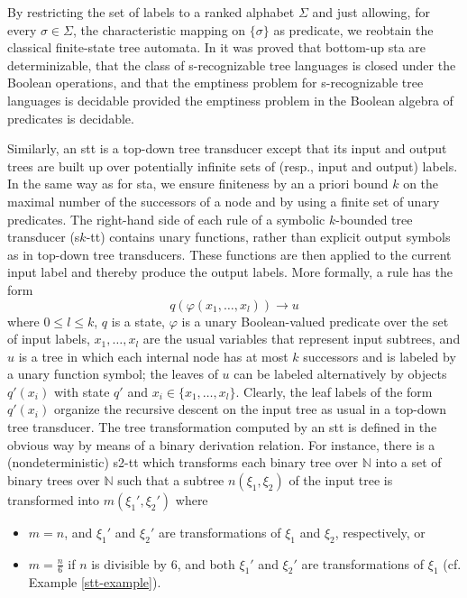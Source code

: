 \documentclass[10pt]{scrartcl}
\begin{document}
By restricting the set of labels to a ranked alphabet $\Sigma$ and just allowing, for every $\sigma \in \Sigma$, the characteristic mapping on $\{\sigma\}$ as predicate, we reobtain the classical finite-state tree automata. In \cite{veabjo11a} it was proved that bottom-up sta are determinizable, that the class of s-recognizable tree languages is closed under the Boolean operations, and that the emptiness problem for s-recognizable tree languages is decidable provided the emptiness problem in the Boolean algebra of predicates is decidable.

Similarly, an stt is a top-down tree transducer \cite{tha70,rou70,eng75} except that its input and output trees  are built up over potentially infinite sets of (resp., input and output) labels. 
In the same way as for  sta, we ensure finiteness by an a priori bound $k$ on the maximal number of the successors of a node and by using a finite set of unary predicates. The right-hand side of each rule of a symbolic $k$-bounded tree transducer (s$k$-tt) 
contains unary functions, rather than explicit output symbols as in top-down tree transducers. These functions are then applied to the current input label and thereby produce the output labels. More formally, a rule has the form
\[
q(\varphi(x_1,\ldots,x_l)) \rightarrow u
\]
where $0\le l\le k$, $q$ is a state, $\varphi$ is a unary Boolean-valued predicate over the set of input labels, $x_1,\ldots,x_l$ are the usual variables that represent input subtrees, and $u$ is a tree in which each internal node has at most $k$ successors and is labeled by a unary function symbol; the leaves of $u$ can be labeled alternatively by objects $q'(x_i)$ with state $q'$ and $x_i \in \{x_1,\ldots,x_l\}$. Clearly, the leaf labels of the form $q'(x_i)$ organize the recursive descent on the input tree as usual in a top-down tree transducer. The tree transformation  computed by an stt is defined in the obvious way by means of a binary derivation relation. 
For instance, there is a (nondeterministic) s2-tt which transforms each binary tree over $\mathbb{N}$ into a set of binary trees over $\mathbb{N}$ such that a subtree $n(\xi_1,\xi_2)$ of the input tree is transformed into $m(\xi_1',\xi_2')$ where
\begin{itemize}
\item $m = n$, and $\xi_1'$ and $\xi_2'$ are transformations of $\xi_1$ and $\xi_2$, respectively, or
\item $m = \frac{n}{6}$ if $n$ is divisible by 6, and both $\xi_1'$ and $\xi_2'$ are transformations of $\xi_1$
(cf. Example \ref{stt-example}). 
\end{itemize} 
\end{document}
